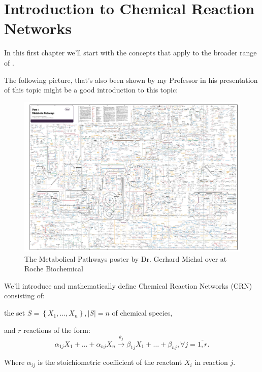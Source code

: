 \chapter{Introduction to Chemical Reaction Networks}\label{chap:ch1}

In this first chapter we'll start with the concepts that apply to the broader range of .

The following picture, that's also been shown by my Professor in his presentation of this topic \parencite{Lorand2024} might be a good introduction to this topic:

\begin{figure}[H]
	\centering
	\includegraphics[width=\textwidth]{chem-pics/metabolic-pathways.png}	
	\caption{The Metabolical Pathways poster by Dr. Gerhard Michal over at Roche Biochemical \cite{RouchePathways}}
	\label{fig:metabolic-pathways}
\end{figure}

We'll introduce and mathematically define Chemical Reaction Networks (CRN) consisting of:

the set $S = \left\{ X_1, \dots, X_n \right\}, \left| S \right| = n$ of chemical species,

and $r$ reactions of the form:
\begin{equation}\label{mass-action_network}
	\alpha_{1j} X_1 + \dots + \alpha_{n j} X_n \xrightarrow{k_j} \beta_{1j} X_1 + \dots + \beta_{n j}, \forall j = \overline{1,r}.	
\end{equation}

Where $\alpha_{ij}$ is the stoichiometric coefficient of the reactant $X_i$ in reaction $j$.

